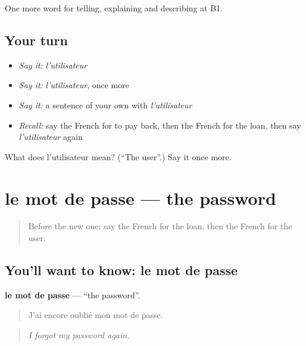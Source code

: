 \begin{grammarlens}[title={What you've built}]
One more word for telling, explaining and describing at B1.
\end{grammarlens}

\subsection*{Your turn}
\begin{itemize}
\raggedright
  \item \emph{Say it:} \emph{l'utilisateur}
  \item \emph{Say it:} \emph{l'utilisateur}, once more
  \item \emph{Say it:} a sentence of your own with \emph{l'utilisateur}
  \item \emph{Recall:} say the French for to pay back, then the French for the loan, then say \emph{l'utilisateur} again
\end{itemize}

\begin{tcolorbox}[breakable,colback=teal!4,colframe=teal!35!black,title={Before you move on}]
What does l'utilisateur mean? (\textquotedblleft{}The user\textquotedblright{}.) Say it once more.
\end{tcolorbox}
\section[le mot de passe]{le mot de passe — the password}

\label{lesson:FR-C395-mot-de-passe}



\begin{quote}
Before the new one: say the French for the loan, then the French for the user.
\end{quote}

\subsection*{You'll want to know: le mot de passe}
\textbf{le mot de passe} — \textquotedblleft{}the password\textquotedblright{}.

\begin{quote}
J'ai encore oublié mon mot de passe.
\end{quote}

\begin{quote}
\emph{I forgot my password again.}
\end{quote}

